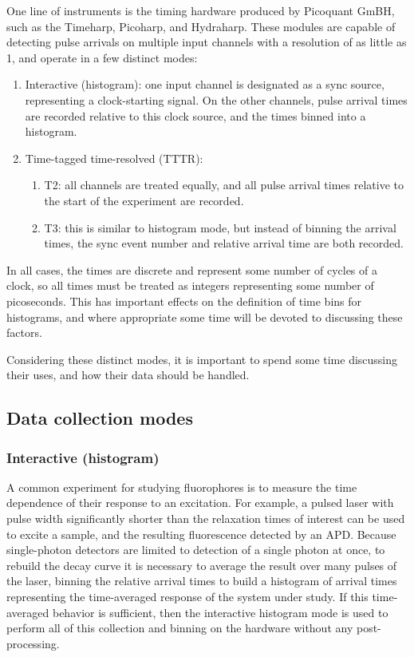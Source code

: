 \documentclass{article}
\begin{document}
One line of instruments is the timing hardware produced by Picoquant GmBH, such as the Timeharp, Picoharp, and Hydraharp. These modules are capable of detecting pulse arrivals on multiple input channels with a resolution of as little as 1\pico\second, and operate in a few distinct modes:
\begin{enumerate}
\item Interactive (histogram): one input channel is designated as a sync source, representing a clock-starting signal. On the other channels, pulse arrival times are recorded relative to this clock source, and the times binned into a histogram. 
\item Time-tagged time-resolved (TTTR): 
	\begin{enumerate}
	\item T2: all channels are treated equally, and all pulse arrival times relative to the start of the experiment are recorded. 
	\item T3: this is similar to histogram mode, but instead of binning the arrival times, the sync event number and relative arrival time are both recorded.
	\end{enumerate}
\end{enumerate}

In all cases, the times are discrete and represent some number of cycles of a clock, so all times must be treated as integers representing some number of picoseconds. This has important effects on the definition of time bins for histograms, and where appropriate some time will be devoted to discussing these factors. 

Considering these distinct modes, it is important to spend some time discussing their uses, and how their data should be handled.

\subsection{Data collection modes}
\subsubsection{Interactive (histogram)}
A common experiment for studying fluorophores is to measure the time dependence of their response to an excitation. For example, a pulsed laser with pulse width significantly shorter than the relaxation times of interest can be used to excite a sample, and the resulting fluorescence detected by an APD. Because single-photon detectors are limited to detection of a single photon at once, to rebuild the decay curve it is necessary to average the result over many pulses of the laser, binning the relative arrival times to build a histogram of arrival times representing the time-averaged response of the system under study. If this time-averaged behavior is sufficient, then the interactive histogram mode is used to perform all of this collection and binning on the hardware without any post-processing. 
\end{document}
